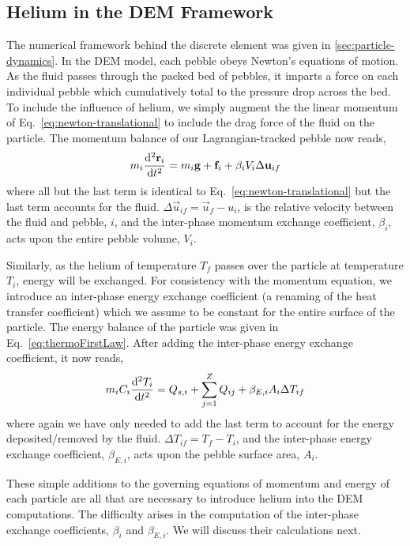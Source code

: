 \subsection{Helium in the DEM Framework}\label{sec:cfdem-heat-transfer}

The numerical framework behind the discrete element was given in \cref{sec:particle-dynamics}. In the DEM model, each pebble obeys Newton's equations of motion. As the fluid passes through the packed bed of pebbles, it imparts a force on each individual pebble which cumulatively total to the pressure drop across the bed. To include the influence of helium, we simply augment the the linear momentum of Eq.~\ref{eq:newton-translational} to include the drag force of the fluid on the particle. The momentum balance of our Lagrangian-tracked pebble now reads,
\begin{equation}\label{eq:cfdem-dem-momentum}
	m_i  \frac{\mathrm{d}^2{\mathbf{r}_i}}{\mathrm{d}t^2} = m_i\mathbf{g} + \mathbf{f}_i + \beta_i V_i \Delta \mathbf{u}_{if}
\end{equation}
where all but the last term is identical to Eq.~\ref{eq:newton-translational} but the last term accounts for the fluid. $\Delta \vec{u}_{if} = \vec{u}_f - u_i$, is the relative velocity between the fluid and pebble, $i$, and the inter-phase momentum exchange coefficient, $\beta_i$, acts upon the entire pebble volume, $V_i$. 

Similarly, as the helium of temperature $T_f$ passes over the particle at temperature $T_i$, energy will be exchanged. For consistency with the momentum equation, we introduce an inter-phase energy exchange coefficient (a renaming of the heat transfer coefficient) which we assume to be constant for the entire surface of the particle. The energy balance of the particle was given in Eq.~\ref{eq:thermoFirstLaw}. After adding the inter-phase energy exchange coefficient, it now reads,
\begin{equation}\label{eq:cfdem-dem-energy}
	m_iC_i \frac{\mathrm{d}^2{T_i}}{\mathrm{d}t^2} = Q_{s,i} + \sum_{j=1}^Z Q_{ij} + \beta_{E,i} A_i \Delta T_{if}
\end{equation}
where again we have only needed to add the last term to account for the energy deposited/removed by the fluid. $\Delta T_{if} = T_f - T_i$, and the inter-phase energy exchange coefficient, $\beta_{E,i}$, acts upon the pebble surface area, $A_i$.

These simple additions to the governing equations of momentum and energy of each particle are all that are necessary to introduce helium into the DEM computations. The difficulty arises in the computation of the inter-phase exchange coefficients, $\beta_i$ and $\beta_{E,i}$. We will discuss their calculations next.

